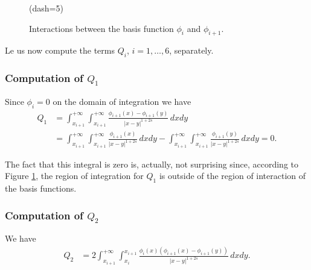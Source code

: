{\begin{figure}[h]
\figdrawline[33,30]
\figdrawline[31,45]
\figdrawline[38,35]
\figdrawline[40,37]
\figdrawline[33,39]
\figdrawline[31,38]
\figdrawline[30,37]
\figdrawline[43,35]
\figset(dash=5)
\figdrawline[47,48]
\figdrawend

\centerline{\box\figBoxA}
\caption{Interactions between the basis function $\phi_i$ and $\phi_{i+1}$.}\label{upp_dia}
\end{figure}


Le us now compute the terms $Q_i$, $i=1,\ldots,6$, separately. 
\subsubsection*{Computation of $Q_1$}
Since $\phi_i = 0$ on the domain of integration we have
\begin{align*}
	Q_1 &= \int_{x_{i+1}}^{+\infty}\int_{x_{i+1}}^{+\infty} \frac{\phi_{i+1}(x)-\phi_{i+1}(y)}{|x-y|^{1+2s}}\,dxdy 
	\\
	&= \int_{x_{i+1}}^{+\infty}\int_{x_{i+1}}^{+\infty} \frac{\phi_{i+1}(x)}{|x-y|^{1+2s}}\,dxdy - \int_{x_{i+1}}^{+\infty}\int_{x_{i+1}}^{+\infty} \frac{\phi_{i+1}(y)}{|x-y|^{1+2s}}\,dxdy = 0.
\end{align*}

The fact that this integral is zero is, actually, not surprising since, according to Figure \ref{upp_dia}, the region of integration for $Q_1$ is outside of the region of interaction of the basis functions.

\subsubsection*{Computation of $Q_2$}
We have
\begin{align*}
	Q_2 &= 2\int_{x_{i+1}}^{+\infty}\int_{x_i}^{x_{i+1}} \frac{\phi_i(x)(\phi_{i+1}(x)-\phi_{i+1}(y))}{|x-y|^{1+2s}}\,dxdy. 
\end{align*}

}
